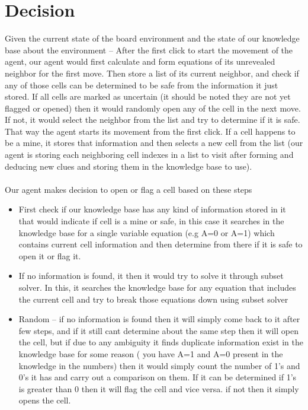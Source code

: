 \documentclass{article}
\begin{document}
\section{Decision}
Given the current state of the board environment and the state of our knowledge base about the environment – After the first click to start the movement of the agent, our agent would first calculate and form equations of its unrevealed neighbor for the first move. Then store a list of its current neighbor, and check if any of those cells can be determined to be safe from the information it just stored. If all cells are marked as uncertain (it should be noted they are not yet flagged or opened) then it would randomly open any of the cell in the next move. If not, it would select the neighbor from the list and try to determine if it is safe. That way the agent starts its movement from the first click. If a cell happens to be a mine, it stores that information and then selects a new cell from the list (our agent is storing each neighboring cell indexes in a list to visit after forming and deducing new clues and storing them in the knowledge base to use).
\\\\
Our agent makes decision to open or flag a cell based on these steps
\\
\begin{itemize}
\item First check if our knowledge base has any kind of information stored in it that would indicate if cell is a mine or safe, in this case it searches in the knowledge base for a single variable equation (e.g A=0 or A=1) which contains current cell information and then determine from there if it is safe to open it or flag it.
\item If no information is found, it then it would try to solve it through subset solver. In this, it searches the knowledge base for any equation that includes the current cell and try to break those equations down using subset solver
\item Random – if no information is found then it will simply come back to it after few steps, and if it still cant determine about the same step then it will open the cell, but if due to any ambiguity it finds  duplicate information exist in the knowledge base for some reason ( you have A=1 and A=0 present in the knowledge in the numbers) then it would simply count the number of 1’s and 0’s it has and carry out a comparison on them. If it can be determined if 1’s is greater than 0 then it will flag the cell and vice versa. if not then it simply opens the cell.
\end{itemize}
\newpage
\end{document}
